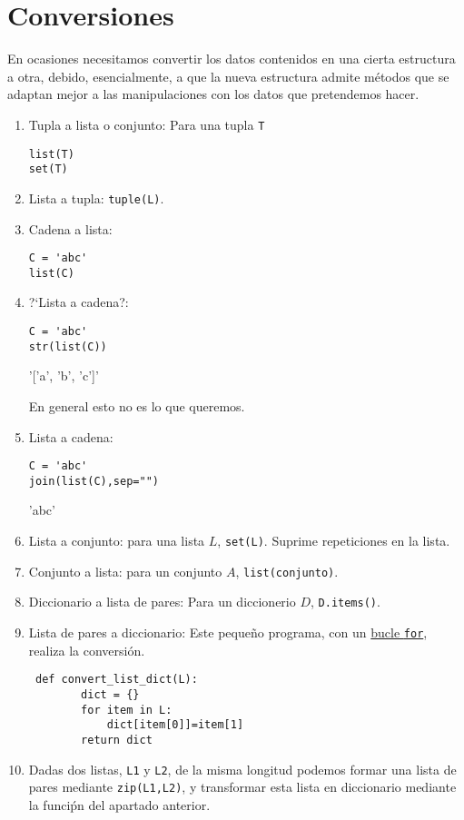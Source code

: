 \section{Conversiones}
En ocasiones necesitamos convertir los datos contenidos en una cierta
estructura a otra, debido, esencialmente, a que la nueva estructura admite
m\'etodos que se adaptan mejor a las manipulaciones con los datos que
pretendemos hacer.
\begin{enumerate}
\item {\sc Tupla a lista o conjunto:} Para una tupla {\tt T}

\begin{lstlisting}
list(T)
set(T)
\end{lstlisting}

    
\item {\sc Lista a tupla:} \lstinline|tuple(L)|.

\item {\sc Cadena a lista:}
\begin{lstlisting}
C = 'abc'
list(C)
\end{lstlisting}
 \begin{Output}
['a', 'b', 'c']
 \end{Output}


 \item {\sc ?`Lista a cadena?}: 
 \begin{lstlisting}
C = 'abc'
str(list(C))
 \end{lstlisting}
 \begin{Output}
'['a', 'b', 'c']'
  \end{Output}
   En general esto {\sc no} es lo que queremos.
 \item {\sc Lista a cadena:}
 \begin{lstlisting}
C = 'abc'
join(list(C),sep="")
\end{lstlisting}
\begin{Output}
'abc'
 \end{Output}
\item  {\sc Lista a conjunto:} para una lista $L$,  \lstinline|set(L)|. Suprime
repeticiones en la lista.
 \item {\sc Conjunto a lista:} para un conjunto $A$, \lstinline|list(conjunto)|.

 \item {\sc Diccionario a lista de pares:} Para un diccionerio $D$, 
\lstinline|D.items()|.

\item {\sc  Lista de pares a diccionario:} Este peque\~no programa, con un
\hyperref[for]{bucle \lstinline|for|}, realiza la conversi\'on. 

\begin{lstlisting}
 def convert_list_dict(L):
        dict = {}
        for item in L:
            dict[item[0]]=item[1]
        return dict
\end{lstlisting}
\item Dadas dos listas, {\tt L1} y {\tt L2}, de la misma longitud podemos formar
una lista de pares mediante \lstinline|zip(L1,L2)|, y
    transformar esta lista en diccionario mediante la funci\'pn del apartado
anterior.
 \end{enumerate}                                             

